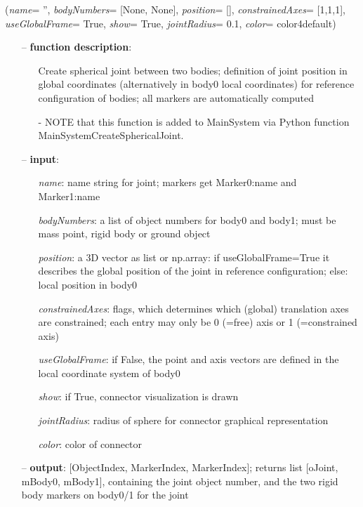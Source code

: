 \begin{flushleft}
\label{sec:mainsystemextensions:CreateSphericalJoint}
({\it name}= '', {\it bodyNumbers}= [None, None], {\it position}= [], {\it constrainedAxes}= [1,1,1], {\it useGlobalFrame}= True, {\it show}= True, {\it jointRadius}= 0.1, {\it color}= color4default)
\end{flushleft}
\setlength{\itemindent}{0.7cm}
\begin{itemize}[leftmargin=0.7cm]
\item[--]
{\bf function description}: \vspace{-6pt}
\begin{itemize}[leftmargin=1.2cm]
\setlength{\itemindent}{-0.7cm}
\item[]Create spherical joint between two bodies; definition of joint position in global coordinates (alternatively in body0 local coordinates) for reference configuration of bodies; all markers are automatically computed
\item[]- NOTE that this function is added to MainSystem via Python function MainSystemCreateSphericalJoint.
\end{itemize}
\item[--]
{\bf input}: \vspace{-6pt}
\begin{itemize}[leftmargin=1.2cm]
\setlength{\itemindent}{-0.7cm}
\item[]{\it name}: name string for joint; markers get Marker0:name and Marker1:name
\item[]{\it bodyNumbers}: a list of object numbers for body0 and body1; must be mass point, rigid body or ground object
\item[]{\it position}: a 3D vector as list or np.array: if useGlobalFrame=True it describes the global position of the joint in reference configuration; else: local position in body0
\item[]{\it constrainedAxes}: flags, which determines which (global) translation axes are constrained; each entry may only be 0 (=free) axis or 1 (=constrained axis)
\item[]{\it useGlobalFrame}: if False, the point and axis vectors are defined in the local coordinate system of body0
\item[]{\it show}: if True, connector visualization is drawn
\item[]{\it jointRadius}: radius of sphere for connector graphical representation
\item[]{\it color}: color of connector
\end{itemize}
\item[--]
{\bf output}: [ObjectIndex, MarkerIndex, MarkerIndex]; returns list [oJoint, mBody0, mBody1], containing the joint object number, and the two rigid body markers on body0/1 for the joint
\vspace{12pt}\end{itemize}
%

